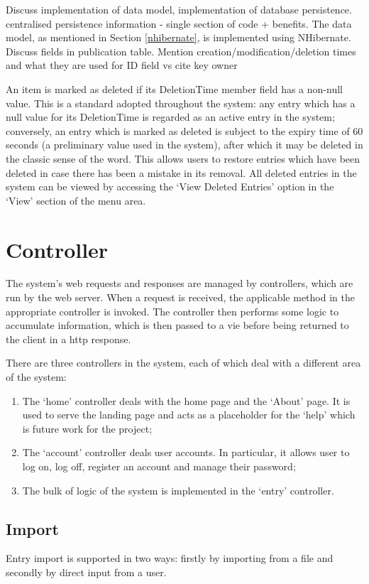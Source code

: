 Discuss implementation of data model, implementation of database persistence. centralised persistence information - single section of code + benefits.
The data model, as mentioned in Section \ref{nhibernate}, is implemented using NHibernate.  
Discuss fields in publication table. Mention creation/modification/deletion times and what they are used for
ID field vs cite key
owner
\revisit\revisit\revisit\revisit\revisit\revisit

An item is marked as deleted if its DeletionTime member field has a non-null value.  This is a standard adopted throughout the system: any entry which has a null value for its DeletionTime is regarded as an active entry in the system; conversely, an entry which is marked as deleted is subject to the expiry time of 60 seconds (a preliminary value used in the system), after which it may be deleted in the classic sense of the word.  This allows users to restore entries which have been deleted in case there has been a mistake in its removal.  All deleted entries  in the system can be viewed by accessing the `View Deleted Entries' option in the `View' section of the menu area.

\section{Controller}
The system's web requests and responses are managed by controllers, which are run by the web server.  When a request is received, the applicable method in the appropriate controller is invoked.  The controller then performs some logic to accumulate information, which is then passed to a vie before being returned to the client in a \gls{http} response.

There are three controllers in the system, each of which deal with a different area of the system:
\begin{enumerate}
	\item The `home' controller deals with the home page and the `About' page.  It is used to serve the landing page and acts as a placeholder for the `help' which is future work for the project;
	\item The `account' controller deals user accounts.  In particular, it allows user to log on, log off, register an account and manage their password;
	\item The bulk of logic of the system is implemented in the `entry' controller.
\end{enumerate}


\subsection{Import}
Entry import is supported in two ways: firstly by importing from a file and secondly by direct input from a user.

